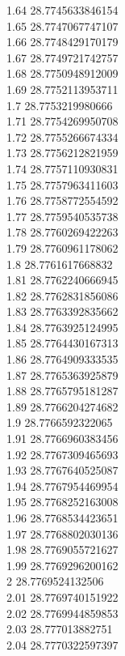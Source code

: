 {1.64	28.7745633846154\\
1.65	28.7747067747107\\
1.66	28.7748429170179\\
1.67	28.7749721742757\\
1.68	28.7750948912009\\
1.69	28.7752113953711\\
1.7	28.7753219980666\\
1.71	28.7754269950708\\
1.72	28.7755266674334\\
1.73	28.7756212821959\\
1.74	28.7757110930831\\
1.75	28.7757963411603\\
1.76	28.7758772554592\\
1.77	28.7759540535738\\
1.78	28.7760269422263\\
1.79	28.7760961178062\\
1.8	28.7761617668832\\
1.81	28.7762240666945\\
1.82	28.7762831856086\\
1.83	28.7763392835662\\
1.84	28.7763925124995\\
1.85	28.7764430167313\\
1.86	28.7764909333535\\
1.87	28.7765363925879\\
1.88	28.7765795181287\\
1.89	28.7766204274682\\
1.9	28.7766592322065\\
1.91	28.7766960383456\\
1.92	28.7767309465693\\
1.93	28.7767640525087\\
1.94	28.7767954469954\\
1.95	28.7768252163008\\
1.96	28.7768534423651\\
1.97	28.7768802030136\\
1.98	28.7769055721627\\
1.99	28.7769296200162\\
2	28.7769524132506\\
2.01	28.7769740151922\\
2.02	28.7769944859853\\
2.03	28.777013882751\\
2.04	28.7770322597397\\
}
